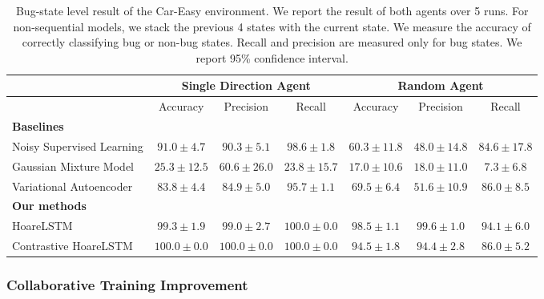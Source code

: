 \documentclass{article}
\begin{document}
\begin{table}[t]
\footnotesize
\centering
\begin{tabular}{@{}lcccccc@{}}
\toprule
                      & \multicolumn{3}{c}{Single Direction Agent} & \multicolumn{3}{c}{Random Agent} \\ \midrule
                      & Accuracy      &  Precision   & Recall    & Accuracy  & Precision   & Recall   \\ \midrule
\textbf{Baselines} \\
Noisy Supervised Learning & $91.0 \pm 4.7$          & $90.3 \pm 5.1$          & $98.6 \pm 1.8$       & $60.3 \pm 11.8$      & $48.0 \pm 14.8$       & $84.6 \pm 17.8$    \\
Gaussian Mixture Model    & $25.3 \pm 12.5$          &     $60.6 \pm 26.0$     & $23.8 \pm 15.7$    & $17.0 \pm 10.6$       & $18.0 \pm 11.0$
       & $7.3 \pm 6.8$    \\
Variational Autoencoder   & $83.8 \pm 4.4$ & $84.9 \pm 5.0$     & $95.7 \pm 1.1$      & $69.5 \pm 6.4$      & $51.6 \pm 10.9$       & $86.0 \pm 8.5$     \\ \midrule
\textbf{Our methods} \\
HoareLSTM                 & $99.3 \pm 1.9$         & $99.0 \pm 2.7$         & $100.0 \pm 0.0$      & $98.5 \pm 1.1$      & $99.6 \pm 1.0$      & $94.1 \pm 6.0$ \\
Contrastive HoareLSTM     & $100.0 \pm 0.0$         & $100.0 \pm 0.0$         & $100.0 \pm 0.0$      & $94.5 \pm 1.8$     & $94.4 \pm 2.8$      &  $86.0 \pm 5.2$   \\ \bottomrule
\end{tabular}
\vspace{0.3cm}
\caption{Bug-state level result of the Car-Easy environment. We report the result of both agents over 5 runs. For non-sequential models, we stack the previous 4 states with the current state. We measure the accuracy of correctly classifying bug or non-bug states. Recall and precision are measured only for bug states. We report 95\% confidence interval.}
\label{tab:car_easy}
\end{table}



\subsubsection{Collaborative Training Improvement}
\label{sec:iterative-training}
\vspace{-2mm}
\end{document}
